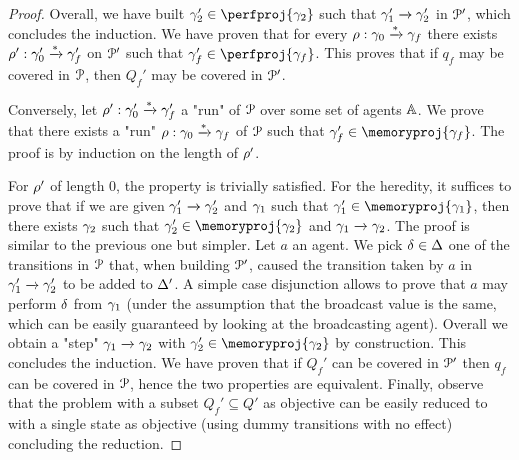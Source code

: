 \begin{proof}
	Overall, we have built $\config_2' \in \perfproj{\config_2}$ such that $\gamma_1' \xrightarrow{} \gamma_2'$ in $\mathcal{P}'$, which concludes the induction. We have proven that for every $\rho: \gamma_0 \xrightarrow{*} \gamma_f$ there exists $\rho': \gamma_0' \xrightarrow{*} \gamma_f'$ on $\mathcal{P}'$ such that $\config_f' \in \perfproj{\config_f}$. This proves that if $q_f$ may be covered in $\mathcal{P}$, then $Q_f'$ may be covered in $\mathcal{P}'$. 

	Conversely, let $\rho' : \gamma_0' \xrightarrow{*} \gamma_f'$ a "run" of $\mathcal{P}$ over some set of agents $\mathbb{A}$. We prove that there exists a "run" $\rho: \gamma_0 \xrightarrow{*} \gamma_f$ of $\mathcal{P}$ such that $\config_f' \in \memoryproj{\config_f}$. The proof is by induction on the length of $\rho'$. 

	For $\rho'$ of length $0$, the property is trivially satisfied. For the heredity, it suffices to prove that if we are given $\gamma_1' \xrightarrow{} \gamma_2'$ and $\gamma_1$ such that $\config_1' \in \memoryproj{\config_1}$, then there exists $\gamma_2$ such that $\config_2' \in \memoryproj{\config_2}$ and $\gamma_1 \xrightarrow{} \gamma_2$. The proof is similar to the previous one but simpler. Let $a$ an agent. We pick $\delta \in \Delta$ one of the transitions in $\mathcal{P}$ that, when building $\mathcal{P}'$, caused the transition taken by $a$ in $\gamma_1' \xrightarrow{} \gamma_2'$ to be added to $\Delta'$. A simple case disjunction allows to prove that $a$ may perform $\delta$ from $\gamma_1$ (under the assumption that the broadcast value is the same, which can be easily guaranteed by looking at the broadcasting agent). Overall we obtain a "step" $\gamma_1 \xrightarrow{} \gamma_2$ with $\config_2' \in \memoryproj{\config_2}$ by construction. This concludes the induction. We have proven that if $Q_f'$ can be covered in $\mathcal{P}'$ then $q_f$ can be covered in $\mathcal{P}$, hence the two properties are equivalent.
	Finally, observe that the \COVER problem with a subset $Q_f' \subseteq Q'$ as objective can be easily reduced to \COVER with a single state as objective (using dummy transitions with no effect) concluding the reduction.
\end{proof}
